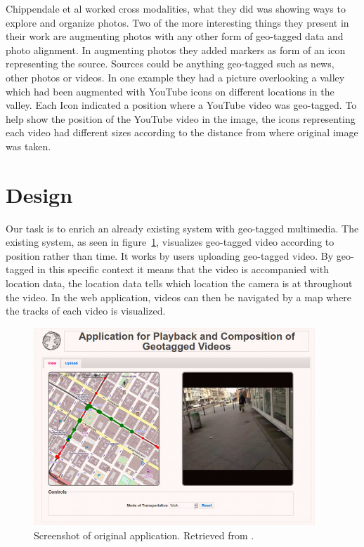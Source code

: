 \documentclass[journal]{IEEEtran}
\begin{document}
Chippendale et al\cite{collective-photography} worked cross modalities, what they did was showing ways to explore and organize photos. Two of the more interesting things they present in their work are augmenting photos with any other form of geo-tagged data and photo alignment. In augmenting photos they added markers as form of an icon representing the source. Sources could be anything geo-tagged such as news, other photos or videos. In one example they had a picture overlooking a valley which had been augmented with YouTube icons on different locations in the valley. Each Icon indicated a position where a YouTube video was geo-tagged. To help show the position of the YouTube video in the image, the icons representing each video had different sizes according to the distance from where original image was taken.

\section{Design}
Our task is to enrich an already existing system\cite{originalsystem} with geo-tagged multimedia. The existing system, as seen in figure~\ref{original-app}, visualizes geo-tagged video according to position rather than time. It works by users uploading geo-tagged video. By geo-tagged in this specific context it means that the video is accompanied with location data, the location data tells which location the camera is at throughout the video. In the web application, videos can then be navigated by a map where the tracks of each video is visualized.

        \begin{figure}[htb]
         \centering
	 \includegraphics[width=400px]{app_small}
         \caption{Screenshot of original application. Retrieved from \cite{originalsystem}.}
         \label{original-app}
        \end{figure}
\end{document}
